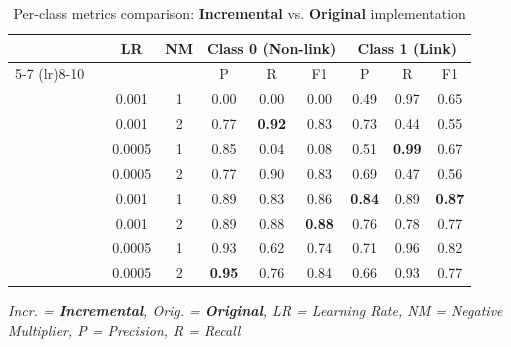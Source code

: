 \begin{table}[h]
	\centering
	\caption{Per-class metrics comparison: \textcolor{drawblue}{\textbf{Incremental}} vs. \textcolor{drawred}{\textbf{Original}} implementation}
	\label{tab:class_metrics_comparison}
	\small
	\begin{tabular}{llcccccccc}
		\toprule
		 &  & \textbf{LR} & \textbf{NM} & \multicolumn{3}{c}{\textbf{Class 0 (Non-link)}} & \multicolumn{3}{c}{\textbf{Class 1 (Link)}}                                                                 \\
		\cmidrule(lr){5-7} \cmidrule(lr){8-10}
		 &  &             &             & P                                               & R                                           & F1            & P             & R             & F1            \\
		\midrule
		\multirow{4}{*}{\rotatebox{90}{\textcolor{drawblue}{\textbf{Incr.}}}}
		 &  & 0.001       & 1           & 0.00                                            & 0.00                                        & 0.00          & 0.49          & 0.97          & 0.65          \\
		 &  & 0.001       & 2           & 0.77                                            & \textbf{0.92}                               & 0.83          & 0.73          & 0.44          & 0.55          \\
		 &  & 0.0005      & 1           & 0.85                                            & 0.04                                        & 0.08          & 0.51          & \textbf{0.99} & 0.67          \\
		 &  & 0.0005      & 2           & 0.77                                            & 0.90                                        & 0.83          & 0.69          & 0.47          & 0.56          \\
		\midrule
		\multirow{4}{*}{\rotatebox{90}{\textcolor{drawred}{\textbf{Orig.}}}}
		 &  & 0.001       & 1           & 0.89                                            & 0.83                                        & 0.86          & \textbf{0.84} & 0.89          & \textbf{0.87} \\
		 &  & 0.001       & 2           & 0.89                                            & 0.88                                        & \textbf{0.88} & 0.76          & 0.78          & 0.77          \\
		 &  & 0.0005      & 1           & 0.93                                            & 0.62                                        & 0.74          & 0.71          & 0.96          & 0.82          \\
		 &  & 0.0005      & 2           & \textbf{0.95}                                   & 0.76                                        & 0.84          & 0.66          & 0.93          & 0.77          \\
		\bottomrule
	\end{tabular}

	\vspace{0.5em}
	\footnotesize
	\textit{Incr. = \textcolor{drawblue}{\textbf{Incremental}}, Orig. = \textcolor{drawred}{\textbf{Original}}, LR = Learning Rate, NM = Negative Multiplier, P = Precision, R = Recall}
\end{table}

